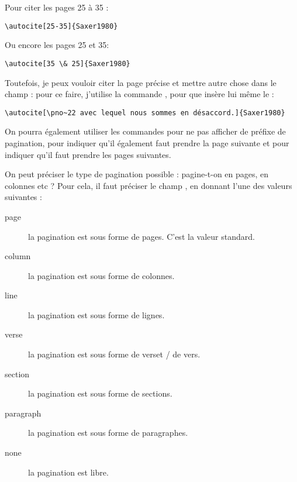  Pour citer les pages 25 à 35 :

\begin{verbatim}
\autocite[25-35]{Saxer1980}
\end{verbatim}

Ou encore les pages 25 et 35:

\begin{verbatim}
\autocite[35 \& 25]{Saxer1980}
\end{verbatim}

Toutefois, je peux vouloir citer la page précise et mettre autre chose dans le champ  : pour ce faire, j'utilise la commande , pour que  insère lui même le  :

\begin{verbatim}
\autocite[\pno~22 avec lequel nous sommes en désaccord.]{Saxer1980}
\end{verbatim}

\begin{quotation}
	\parencite[\pno~22 avec lequel nous sommes en désaccord.]{Saxer1980}
\end{quotation}

On pourra également utiliser les commandes  pour ne pas afficher de préfixe de pagination,   pour indiquer qu'il également faut prendre la page suivante et  pour indiquer qu'il faut prendre les pages suivantes.

On peut préciser le type de pagination possible : pagine-t-on en pages, en colonnes etc ? Pour cela, il faut préciser le champ , en donnant l'une des valeurs suivantes : 

\begin{description}
\item[page]la pagination est sous forme de pages. C'est la valeur standard.
\item[column]la pagination est sous forme de colonnes.
\item[line]la pagination est sous forme de lignes.
\item[verse]la pagination est sous forme de verset / de vers. 
\item[section]la pagination est sous forme de sections.
\item[paragraph]la pagination est sous forme de paragraphes.
\item[none]la pagination est libre.
\end{description}



